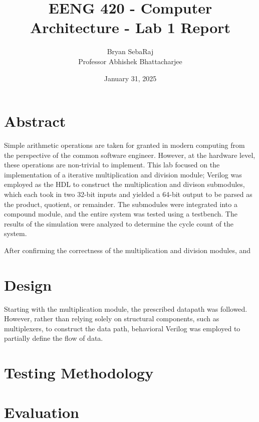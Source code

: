 \documentclass[12pt]{article}
\title{EENG 420 - Computer Architecture - Lab 1 Report}
\author{Bryan SebaRaj \\[0.5em] Professor Abhishek Bhattacharjee}
\date{January 31, 2025}
\begin{document}
\maketitle

%
%

\section*{Abstract}

Simple arithmetic operations are taken for granted in modern computing from the
perspective of the common software engineer. However, at the hardware level,
these operations are non-trivial to implement. This lab focused on the
implementation of a iterative multiplication and division module; Verilog was
employed as the HDL to construct the multiplication and divison submodules,
which each took in two 32-bit inputs and yielded a 64-bit output to be parsed
as the product, quotient, or remainder. The submodules were integrated into a
compound module, and the entire system was tested using a testbench. The
results of the simulation were analyzed to determine the cycle count of the
system.

After confirming the correctness of the multiplication and division modules, and 


\section*{Design}

Starting with the multiplication module, the prescribed datapath was followed.
However, rather than relying solely on structural components, such as
multiplexers, to construct the data path, behavioral Verilog was employed to
partially define the flow of data.



\section*{Testing Methodology}


\section*{Evaluation}
\end{document}
